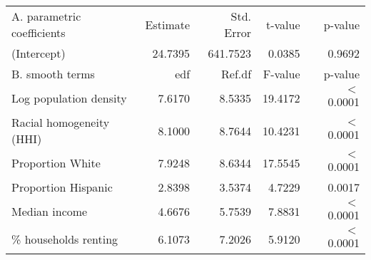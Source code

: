 \begin{table}[ht]
\centering
\begin{tabular}{lrrrr}
   \hline
A. parametric coefficients & Estimate & Std. Error & t-value & p-value \\ 
  (Intercept) & 24.7395 & 641.7523 & 0.0385 & 0.9692 \\ 
   \hline
B. smooth terms & edf & Ref.df & F-value & p-value \\ 
  Log population density & 7.6170 & 8.5335 & 19.4172 & $<$ 0.0001 \\ 
  Racial homogeneity (HHI) & 8.1000 & 8.7644 & 10.4231 & $<$ 0.0001 \\ 
  Proportion White & 7.9248 & 8.6344 & 17.5545 & $<$ 0.0001 \\ 
  Proportion Hispanic & 2.8398 & 3.5374 & 4.7229 & 0.0017 \\ 
  Median income & 4.6676 & 5.7539 & 7.8831 & $<$ 0.0001 \\ 
  \% households renting & 6.1073 & 7.2026 & 5.9120 & $<$ 0.0001 \\ 
   \hline
\end{tabular}
\caption{ } 
\label{Demographic GAM}
\end{table}
